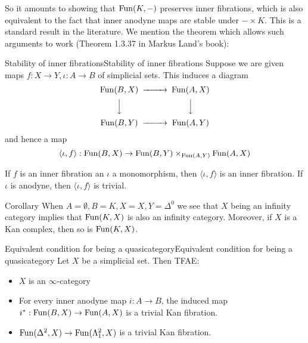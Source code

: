So it amounts to showing that $\mathrm{Fun}(K,-)$ preserves inner fibrations, which is also equivalent to the fact that inner anodyne maps are stable under $-\times K$. This is a standard result in the literature. We mention the theorem which allows such arguments to work (Theorem 1.3.37 in Markus Land's book):

\begin{theorem}{Stability of inner fibrations}{Stability of inner fibrations}
    Suppose we are given maps $f:X\rightarrow Y, \iota:A\rightarrow B$ of simplicial sets. This induces a diagram $$\begin{CD}
        \Fun(B,X) @>>> \Fun (A,X)\\
        @VVV @VVV\\
        \Fun(B,Y) @>>> \Fun(A,Y)
    \end{CD}$$
    and hence a map $$\langle \iota ,f \rangle:\mathrm{Fun}(B,X)\rightarrow \mathrm{Fun}(B,Y)\times_{\mathrm{Fun}(A,Y)}\mathrm{Fun}(A,X)$$

    If $f$ is an inner fibration an $\iota$ a monomorphism, then $\langle \iota, f \rangle$ is an inner fibration. If $\iota$ is anodyne, then $\langle \iota, f \rangle$ is trivial.
\end{theorem}

\begin{corollary}{Corollary}{}
    When $A=\emptyset,B=K, X=X, Y=\Delta^0$ we see that $X$ being an infinity category implies that $\mathrm{Fun}(K,X)$ is also an infinity category. Moreover, if $X$ is a Kan complex, then so is $\mathrm{Fun}(K,X)$.
    
\end{corollary}


\begin{lemma}{Equivalent condition for being a quasicategory}{Equivalent condition for being a quasicategory}
    Let $X$ be a simplicial set. Then TFAE:
    \begin{itemize}
        \item $X$ is an $\infty$-category
        \item For every inner anodyne map $i:A\rightarrow B$, the induced map $i^*:\mathrm{Fun}(B,X)\rightarrow \mathrm{Fun}(A,X)$ is a trivial Kan fibration.
        \item $\mathrm{Fun}(\Delta^2,X)\rightarrow \mathrm{Fun}(\Lambda^2_1,X)$ is a trivial Kan fibration.
    \end{itemize}
\end{lemma}

